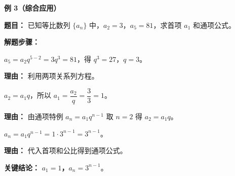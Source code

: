 \begin{examplebox}
	\medskip
	\textbf{\textcolor{CExample}{例 3（综合应用）}}

	\textbf{\textcolor{CExample}{题目：}}
	已知等比数列 $\{a_n\}$ 中，$a_2=3$，$a_5=81$，求首项 $a_1$ 和通项公式。

	\textbf{\textcolor{CExample}{解题步骤：}}
	\begin{description}[style=nextline, leftmargin=2.8em, labelsep=0.5em, itemsep=0.45em]
		\item[\textbf{第一步（求公比）：}] $a_5 = a_2 q^{5-2} = 3q^3 = 81$，得 $q^3=27$，$q=3$。
			\par\textbf{理由：}
			利用两项关系列方程。
		\item[\textbf{第二步（求首项）：}] $a_2 = a_1 q$，所以 $a_1 = \dfrac{a_2}{q} = \dfrac{3}{3}=1$。
			\par\textbf{理由：}
			由通项特例 $a_n = a_1 q^{n-1}$ 取 $n=2$ 得 $a_2 = a_1 q$。
		\item[\textbf{第三步（写通项）：}] $a_n = a_1 q^{n-1} = 1 \cdot 3^{n-1} = 3^{n-1}$。
			\par\textbf{理由：}
			代入首项和公比得到通项公式。
	\end{description}

	\textbf{\textcolor{CExample}{关键结论：}}
	\textbf{$a_1=1$，$a_n=3^{n-1}$}。

\end{examplebox}
